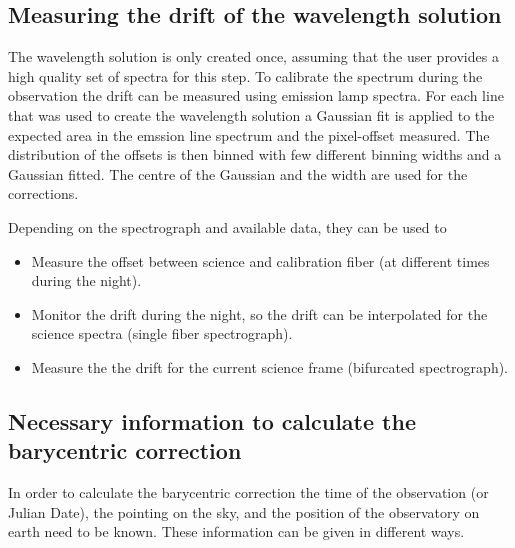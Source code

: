 \documentclass[10pt,a4paper]{article}
\begin{document}
\subsection{Measuring the drift of the wavelength solution}
The wavelength solution is only created once, assuming that the user provides a high quality set of spectra for this step. To calibrate the spectrum during the observation the drift can be measured using emission lamp spectra. For each line that was used to create the wavelength solution a Gaussian fit is applied to the expected area in the emssion line spectrum and the pixel-offset measured. The distribution of the offsets is then binned with few different binning widths and a Gaussian fitted. The centre of the Gaussian and the width are used for the corrections.

Depending on the spectrograph and available data, they can be used to
\begin{itemize}
  \item Measure the offset between science and calibration fiber (at different times during the night).
  \item Monitor the drift during the night, so the drift can be interpolated for the science spectra (single fiber spectrograph).
  \item Measure the the drift for the current science frame (bifurcated spectrograph).
\end{itemize}


\subsection{Necessary information to calculate the barycentric correction}
\label{Section:barycentric_correction}
In order to calculate the barycentric correction the time of the observation (or Julian Date), the pointing on the sky, and the position of the observatory on earth need to be known. These information can be given in different ways. 
\end{document}

